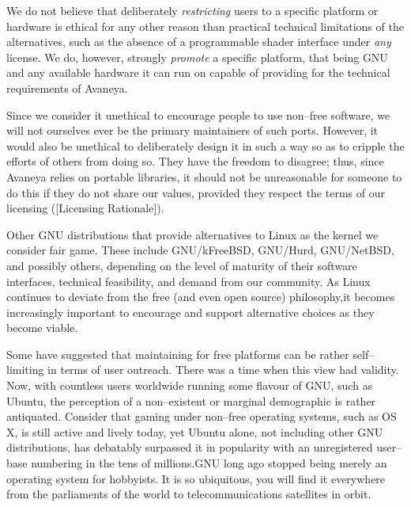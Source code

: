 We do not believe that deliberately {\it restricting} users to a specific platform or hardware is ethical for any other reason than practical technical limitations of the alternatives, such as the absence of a programmable shader interface under {\it any} license. We do, however, strongly {\it promote} a specific platform, that being GNU and any available hardware it can run on capable of providing for the technical requirements of Avaneya.

Since we consider it unethical to encourage people to use non--free software, we will not ourselves ever be the primary maintainers of such ports. However, it would also be unethical to deliberately design it in such a way so as to cripple the efforts of others from doing so. They have the freedom to disagree; thus, since Avaneya relies on portable libraries, it should not be unreasonable for someone to do this if they do not share our values, provided they respect the terms of our licensing ([Licensing Rationale]).

Other GNU distributions that provide alternatives to Linux as the kernel we consider fair game. These include GNU/kFreeBSD, GNU/Hurd, GNU/NetBSD, and possibly others, depending on the level of maturity of their software interfaces, technical feasibility, and demand from our community. As Linux continues to deviate from the free (and even open source) philosophy, it becomes increasingly important to encourage and support alternative choices as they become viable.

Some have suggested that maintaining for free platforms can be rather self--limiting in terms of user outreach. There was a time when this view had validity. Now, with countless users worldwide running some flavour of GNU, such as Ubuntu, the perception of a non--existent or marginal demographic is rather antiquated. Consider that gaming under non--free operating systems, such as OS X, is still active and lively today, yet Ubuntu alone, not including other GNU distributions, has debatably surpassed it in popularity with an unregistered user--base numbering in the tens of millions. GNU long ago stopped being merely an operating system for hobbyists. It is so ubiquitous, you will find it everywhere from the parliaments of the world to telecommunications satellites in orbit.

\StopChapter

